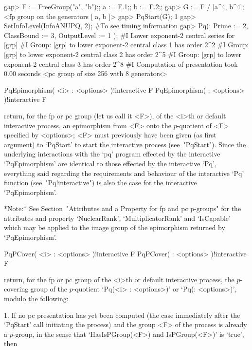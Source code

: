 \beginexample
gap> F := FreeGroup("a", "b");; a := F.1;; b := F.2;;
gap> G := F / [a^4, b^4];
<fp group on the generators [ a, b ]>
gap> PqStart(G);
1
gap> SetInfoLevel(InfoANUPQ, 2); #To see timing information               
gap> Pq(: Prime := 2, ClassBound := 3, OutputLevel := 1 );
#I  Lower exponent-2 central series for [grp]
#I  Group: [grp] to lower exponent-2 central class 1 has order 2^2
#I  Group: [grp] to lower exponent-2 central class 2 has order 2^5
#I  Group: [grp] to lower exponent-2 central class 3 has order 2^8
#I  Computation of presentation took 0.00 seconds
<pc group of size 256 with 8 generators>
\endexample

\>PqEpimorphism( <i> : <options> )!{interactive} F
\>PqEpimorphism( : <options> )!{interactive} F

return, for  the fp  or pc group (let us  call it <F>),  of the  <i>th or
default interactive  {\ANUPQ} process, an  epimorphism from <F>  onto the
$p$-quotient of <F> specified by <options>; <F> must previously have been
given (as first argument) to  `PqStart' to start the interactive {\ANUPQ}
process (see~"PqStart"). Since the  underlying interactions with the `pq'
program  effected by  the  interactive `PqEpimorphism'  are identical  to
those  effected by the  interactive `Pq',  everything said  regarding the
requirements   and   behaviour   of   the   interactive   `Pq'   function
(see~"Pq!interactive")   is   also   the   case   for   the   interactive
`PqEpimorphism'.

*Note:*
See Section~"Attributes and a Property for fp and pc  p-groups"  for  the
attributes   and   property   `NuclearRank',   `MultiplicatorRank'    and
`IsCapable' which may be applied to the image group  of  the  epimorphism
returned by `PqEpimorphism'.

\>PqPCover( <i> : <options> )!{interactive} F
\>PqPCover( : <options> )!{interactive} F

return,  for the  fp or  pc  group of  the <i>th  or default  interactive
{\ANUPQ} process,  the $p$-covering group  of the $p$-quotient  `Pq(<i> :
<options>)' or `Pq(: <options>)', modulo the following:

\beginlist%

\item{1.}
If no pc presentation has yet been computed (the case  immediately  after
the `PqStart' call initiating the process)  and  the  group  <F>  of  the
process is already a $p$-group, in the sense that  `HasIsPGroup(<F>)  and
IsPGroup(<F>)' is `true', then

